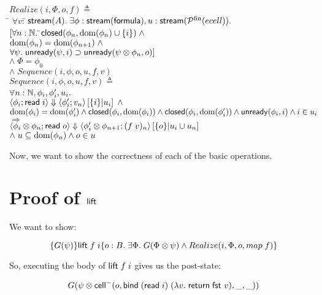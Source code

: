 \documentclass{article}
\begin{document}
\begin{tabbing}
$Realize(i, \Phi, o, f) \triangleq$ \\
\qquad\= $\forall v:$\=$\,\mbox{\textsf{{stream}}}({A}).\; \exists \phi:\mbox{\textsf{{stream}}}({\mbox{\textsf{{formula}}}}), u:\mbox{\textsf{{stream}}}({\mathcal{P}^{\mathrm{fin}}({ecell})}).$ \\
\>\> $[\forall n:\mathbb{N}.\;$\=$\mbox{\textsf{{closed}}}({\phi_n}, {\mbox{dom}({\phi_n}) \cup \{{i}\}}) \;\land$ \\
\>\>\>$\mbox{dom}({\phi_n}) = \mbox{dom}({\phi_{n+1}})\; \land$ \\
\>\>\>$\forall \psi.\; \mbox{\textsf{{unready}}}({\psi}, {i}) \supset \mbox{\textsf{{unready}}}({\psi \otimes \phi_n}, {o})]$ \\
\>\> $\land \; \Phi = \phi_0$ \\
\>\> $\land \;  Sequence(i, \phi, o, u, f, v)$ \\[1em]


$Sequence(i, \phi, o, u, f, v) \triangleq$ \\
\> $\forall $\=$ n:\mathbb{N}, \phi_i, \phi'_i, u_i.$ \\
\>\> $\left<{\phi_i};{\mbox{\textsf{{read}}}\; i}\right>\Downarrow\left<{\phi'_i};{v_n}\right>\left[{\{{i}\}}|{u_i}\right] \; \land$ \\
\>\> $\mbox{dom}({\phi_i}) = \mbox{dom}({\phi'_i}) \land 
        \mbox{\textsf{{closed}}}({\phi_i}, {\mbox{dom}({\phi_i})}) \land 
        \mbox{\textsf{{closed}}}({\phi_i}, {\mbox{dom}({\phi'_i})}) \land
        \mbox{\textsf{{unready}}}({\phi_i}, {i}) \land
        i \in u_i$ \\
\>\> $\Longrightarrow$ \\
\>\> $\left<{\phi_i \otimes \phi_n};{\mbox{\textsf{{read}}}\; o}\right>\Downarrow\left<{\phi'_i \otimes \phi_{n+1}};{(f\;v)_n}\right>\left[{\{{o}\}}|{u_i \cup u_n}\right]$ \\
\>\> $\land\; u \subseteq \mbox{dom}({\phi_n}) \land o \in u$ \\
\end{tabbing}

Now, we want to show the correctness of each of the basic operations. 

\section{Proof of $\mbox{\textsf{{lift}}}\;$}

We want to show:

\begin{displaymath}
\{{G(\psi)}\}{\mbox{\textsf{{lift}}}\; f\;i}\{{o:B}.\;{\exists \Phi.\; G(\Phi \otimes \psi) \land Realize(i,\Phi,o,map\;f)}\}
\end{displaymath}

So, executing the body of $\mbox{\textsf{{lift}}}\; f\;i$ gives us the post-state:

\begin{displaymath}
  G(\psi \otimes \mbox{\textsf{{cell}}}^{-}({o}, {\mbox{\textsf{{bind}}}\; (\mbox{\textsf{{read}}}\; i) \;(\lambda v.\;\mbox{\textsf{{return}}}\; \mbox{\textsf{{fst }}} v)}, {\_}, {\_}))
\end{displaymath}
\end{document}
